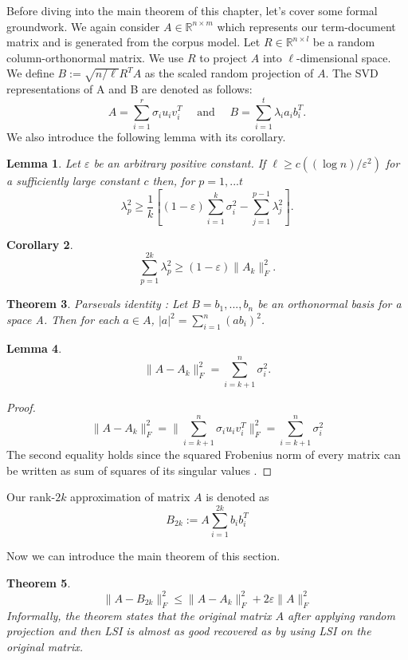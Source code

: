 \documentclass[a4paper,11pt,DIV=15]{scrartcl} %
\renewcommand{\epsilon}{\varepsilon}
\theoremstyle{plain}
\newtheorem{theorem}{Theorem}
\newtheorem{lemma}[theorem]{Lemma}
\newtheorem{corollary}[theorem]{Corollary}
\theoremstyle{definition}
\begin{document}
Before diving into the main theorem of this chapter, let's cover some formal groundwork.
We again consider $A \in \mathbb{R}^{n \times m}$ which represents our term-document matrix and is generated from the corpus model. Let $R \in \mathbb{R}^{n \times l} $ be a random column-orthonormal matrix. We use $R$ to project $A$ into $\ell$-dimensional space. We define $B:= \sqrt{n/\ell}R^TA$ as the scaled random projection of $A$.
The SVD representations of A and B are denoted as follows:
\[
A = \sum_{i=1}^r \sigma_i u_i v_i^T \,\,\,\,\,\,\,\,\text{and}\,\,\,\,\,\,\,\, B=\sum_{i=1}^t \lambda_i a_i b_i^T.
\]
We also introduce the following lemma with its corollary.
\begin{lemma}
Let $\epsilon$ be an arbitrary positive constant. If $\ell \geq c((\log n)/\epsilon^2)$ for a sufficiently large constant $c$ then, for  $p =1,...t$
\[
\lambda_p^2 \geq \dfrac{1}{k} [(1-\epsilon) \sum_{i=1}^k \sigma_i^2 - \sum_{j=1}^{p-1} \lambda_j^2].
\]
\end{lemma}
\begin{corollary}
\[
\sum_{p=1}^{2k} \lambda_p^2 \geq (1-\epsilon) \lVert A_k \rVert_F^2.
\]
\end{corollary}
\begin{theorem}
    Parsevals identity \cite{hogben2013handbook}:
    Let $B = {b_1,...,b_n}$ be an orthonormal basis for a space A. Then for each $a \in A$, $|a|^2 = \sum_{i=1}^n (ab_i)^2$.
\end{theorem}
\begin{lemma}
\label{lem:A_Ak}
\[
\lVert A - A_k \rVert_F^2  = \sum_{i=k+1}^n \sigma_i^2. 
\]
\end{lemma} 
\begin{proof}
\[
\lVert A - A_k \rVert_F^2 = \lVert \sum_{i=k+1}^n \sigma_i u_i v_i^T \rVert_F^2  = \sum_{i=k+1}^n \sigma_i^2 
\]
The second equality holds since the squared Frobenius norm of every matrix can be written as sum of squares of its singular values \cite{FrobeniusDef}.
    
\end{proof}


Our rank-$2k$ approximation of matrix $A$ is denoted as
\[
B_{2k} := A \sum_{i=1}^{2k} b_ib_i^T
\]

Now we can introduce the main theorem of this section.
\begin{theorem}
\[
    \lVert A - B_{2k} \rVert_F^2 \leq \lVert A - A_k \rVert_F^2 + 2\epsilon\lVert A \rVert_F^2
\]
Informally, the theorem states that the original matrix $A$ after applying random projection and then LSI is almost as good recovered as by using LSI on the original matrix.
\end{theorem}
\end{document}

